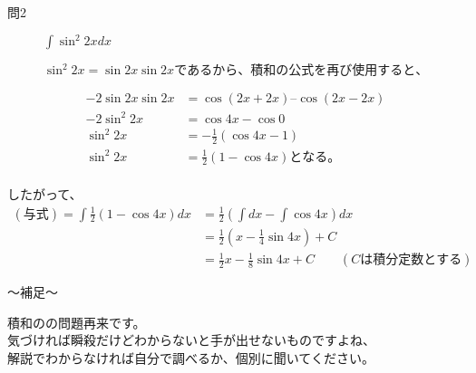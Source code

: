 \documentclass[dvipdfmx,uplatex]{jsarticle}
\begin{document}
\begin{description}
    \item [問2] $ \displaystyle \int \sin^2{2x} dx $
\end{description}

\begin{equation*}
    \sin^2{2x} = \sin{2x}\sin{2x}であるから、積和の公式を再び使用すると、
\end{equation*}

\begin{align*}
    -2\sin{2x}\sin{2x} &= \cos(2x+2x) – \cos(2x-2x) \\
    -2\sin^2{2x} &= \cos{4x} - \cos{0} \\
    \sin^2{2x} &= -\frac{1}{2}(\cos4x - 1) \\
    \sin^2{2x} &= \frac{1}{2}(1 - \cos{4x})となる。 \\
\end{align*}

したがって、\\
\begin{align*}
    (与式) = \int\frac{1}{2}(1 - \cos{4x}) dx
    &= \frac{1}{2}\left(\int{dx} - \int\cos{4x}\right)dx \\
    &= \frac{1}{2}\left(x - \frac{1}{4}\sin{4x}\right) + C \\
    &= \frac{1}{2}x - \frac{1}{8}\sin{4x} + C \qquad (Cは積分定数とする)
\end{align*}

\begin{boxnote}
    〜補足〜
    \begin{center}
        積和のの問題再来です。\\
        気づければ瞬殺だけどわからないと手が出せないものですよね、 \\
        解説でわからなければ自分で調べるか、個別に聞いてください。
    \end{center}
\end{boxnote}
\end{document}
